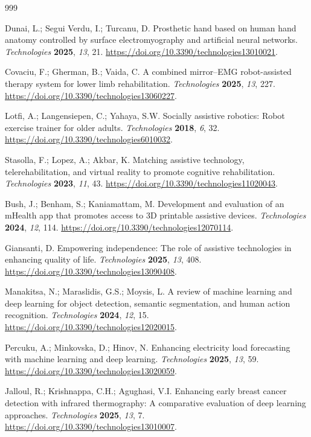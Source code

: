 \documentclass[technologies,article,submit,pdftex,moreauthors]{Definitions/mdpi}
\begin{document}
\begin{thebibliography}{999}

Dunai, L.; Segui Verdu, I.; Turcanu, D. Prosthetic hand based on human hand anatomy controlled by surface electromyography and artificial neural networks. \textit{Technologies} \textbf{2025}, \textit{13}, 21. \url{https://doi.org/10.3390/technologies13010021}.

Covaciu, F.; Gherman, B.; Vaida, C. A combined mirror--EMG robot-assisted therapy system for lower limb rehabilitation. \textit{Technologies} \textbf{2025}, \textit{13}, 227. \url{https://doi.org/10.3390/technologies13060227}.

Lotfi, A.; Langensiepen, C.; Yahaya, S.W. Socially assistive robotics: Robot exercise trainer for older adults. \textit{Technologies} \textbf{2018}, \textit{6}, 32. \url{https://doi.org/10.3390/technologies6010032}.

Stasolla, F.; Lopez, A.; Akbar, K. Matching assistive technology, telerehabilitation, and virtual reality to promote cognitive rehabilitation. \textit{Technologies} \textbf{2023}, \textit{11}, 43. \url{https://doi.org/10.3390/technologies11020043}.

Bush, J.; Benham, S.; Kaniamattam, M. Development and evaluation of an mHealth app that promotes access to 3D printable assistive devices. \textit{Technologies} \textbf{2024}, \textit{12}, 114. \url{https://doi.org/10.3390/technologies12070114}.

Giansanti, D. Empowering independence: The role of assistive technologies in enhancing quality of life. \textit{Technologies} \textbf{2025}, \textit{13}, 408. \url{https://doi.org/10.3390/technologies13090408}.

Manakitsa, N.; Maraslidis, G.S.; Moysis, L. A review of machine learning and deep learning for object detection, semantic segmentation, and human action recognition. \textit{Technologies} \textbf{2024}, \textit{12}, 15. \url{https://doi.org/10.3390/technologies12020015}.

Percuku, A.; Minkovska, D.; Hinov, N. Enhancing electricity load forecasting with machine learning and deep learning. \textit{Technologies} \textbf{2025}, \textit{13}, 59. \url{https://doi.org/10.3390/technologies13020059}.

Jalloul, R.; Krishnappa, C.H.; Agughasi, V.I. Enhancing early breast cancer detection with infrared thermography: A comparative evaluation of deep learning approaches. \textit{Technologies} \textbf{2025}, \textit{13}, 7. \url{https://doi.org/10.3390/technologies13010007}.


\end{thebibliography}
\end{document}
